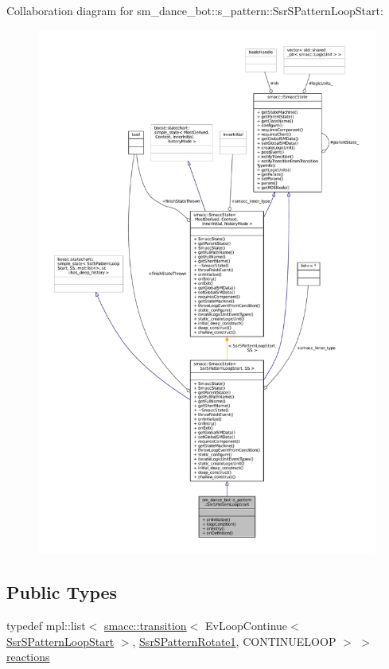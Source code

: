 Collaboration diagram for sm\+\_\+dance\+\_\+bot\+:\+:s\+\_\+pattern\+:\+:Ssr\+S\+Pattern\+Loop\+Start\+:
\nopagebreak
\begin{figure}[H]
\begin{center}
\leavevmode
\includegraphics[width=350pt]{structsm__dance__bot_1_1s__pattern_1_1SsrSPatternLoopStart__coll__graph}
\end{center}
\end{figure}
\subsection*{Public Types}
\begin{DoxyCompactItemize}
\item 
typedef mpl\+::list$<$ \hyperlink{classsmacc_1_1transition}{smacc\+::transition}$<$ Ev\+Loop\+Continue$<$ \hyperlink{structsm__dance__bot_1_1s__pattern_1_1SsrSPatternLoopStart}{Ssr\+S\+Pattern\+Loop\+Start} $>$, \hyperlink{structsm__dance__bot_1_1s__pattern_1_1SsrSPatternRotate1}{Ssr\+S\+Pattern\+Rotate1}, C\+O\+N\+T\+I\+N\+U\+E\+L\+O\+OP $>$ $>$ \hyperlink{structsm__dance__bot_1_1s__pattern_1_1SsrSPatternLoopStart_a166dfaa83a344e3fc7917827aa776102}{reactions}
\end{DoxyCompactItemize}
